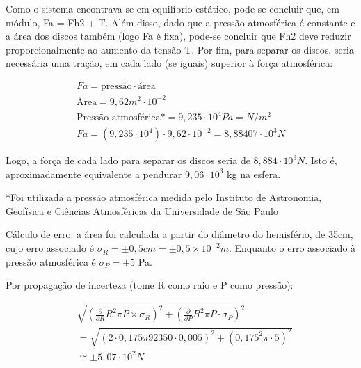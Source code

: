 
Como o sistema encontrava-se em equilíbrio estático, pode-se concluir que, em módulo, Fa = Fh2 + T. Além disso, dado que a pressão atmosférica é constante e a área dos discos também (logo Fa é fixa), pode-se concluir que Fh2 deve reduzir proporcionalmente ao aumento da tensão T. Por fim, para separar os discos, seria necessária uma tração, em cada lado (se iguais) superior à força atmosférica:


\begin{align*}
    Fa = \text{pressão} \cdot\text{área}\\
    \text{Área} = 9,62 m^2 \cdot 10^{-2}\\
    \text{Pressão atmosférica*} = 9,235 \cdot 10^4 Pa = N/m^2\\
    Fa = (9,235 \cdot10^4) \cdot 9,62 \cdot 10^{-2} = 8,88407 \cdot 10^3 N  
\end{align*}

	Logo, a força de cada lado para separar os discos seria de \(8,884 \cdot 10^3 N\). Isto é, aproximadamente equivalente a pendurar \(9,06 \cdot10^3\) kg na esfera.
 
    *Foi utilizada a pressão atmosférica medida pelo Instituto de Astronomia, Geofísica e Ciências Atmosféricas da Universidade de São Paulo %

    
	Cálculo de erro: a área foi calculada a partir do diâmetro do hemisfério, de 35cm, cujo erro associado é \(\sigma_R = \pm0,5cm = \pm0,5\times10^{-2}m\). Enquanto o erro associado à pressão atmosférica é \(\sigma_P = \pm 5\) Pa.


	Por propagação de incerteza (tome R como raio e P como pressão):

\begin{align*}
&\sqrt{\left( \frac{\partial }{\partial R} R^{2}\pi P \times\sigma_R \right)^{2} + \left( \frac{\partial }{\partial P} R^{2}\pi P \cdot\sigma_P \right)^{2}}\\
&= \sqrt{\left( 2 \cdot 0,175 \pi 92350 \cdot 0,005 \right)^{2} + \left(0,175^{2}\pi \cdot 5 \right)^{2}} \\
&\cong  \pm 5,07 \cdot 10^2 N
\end{align*}

